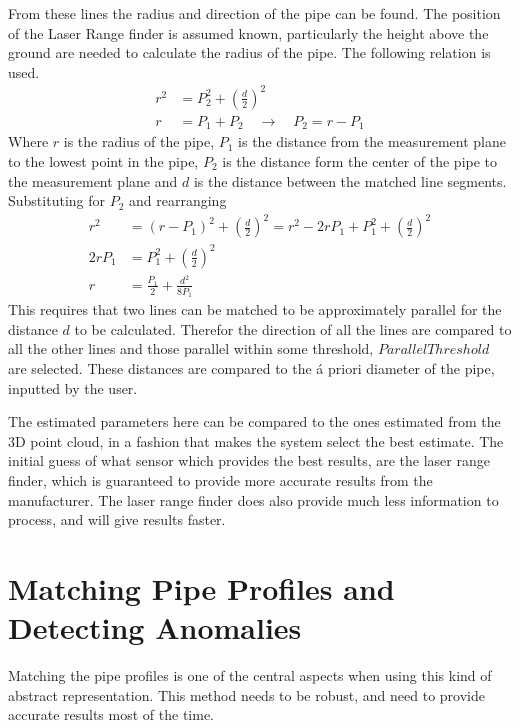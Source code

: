 From these lines the radius and direction of the pipe can be found. The position of the
Laser Range finder is assumed known, particularly the height above the ground are needed
to calculate the radius of the pipe. The following relation is used.
\begin{align}
    r^2 &= P_2^2 + \left(\frac{d}{2} \right)^2 \\
    r &= P_1 + P_2  \quad \rightarrow \quad P_2 = r - P_1
\end{align}
Where $r$ is the radius of the pipe, $P_1$ is the distance from the measurement plane to
the lowest point in the pipe, $P_2$ is the distance form the center of the pipe to the
measurement plane and $d$ is the distance between the matched line segments. Substituting
for $P_2$ and rearranging
\begin{equation}
    \begin{aligned}
        r^2& = (r - P_1)^2 + \left(\frac{d}{2}\right)^2 = r^2 - 2 r P_1 + P_1^2 +
        \left(\frac{d}{2}\right)^2 \\
        2 r P_1 &= P_1^2 + \left(\frac{d}{2}\right)^2 \\
        r &= \frac{P_1}{2} + \frac{d^2}{8 P_1}
    \end{aligned}
\end{equation}
This requires that two lines can be matched to be approximately parallel for the distance
$d$ to be calculated. Therefor the direction of all the lines are compared to all the
other lines and those parallel within some threshold, $ParallelThreshold$ are selected.
These distances are compared to the \'a priori diameter of the pipe, inputted by the user. 

The estimated parameters here can be compared to the ones estimated from the 3D point
cloud, in a fashion that makes the system select the best estimate. The initial guess of
what sensor which provides the best results, are the laser range finder, which is
guaranteed to provide more accurate results from the manufacturer. The laser range finder
does also provide much less information to process, and will give results faster. 


\section{Matching Pipe Profiles and Detecting Anomalies}
Matching the pipe profiles is one of the central aspects when using this kind of abstract
representation. This method needs to be robust, and need to provide accurate results most
of the time.

